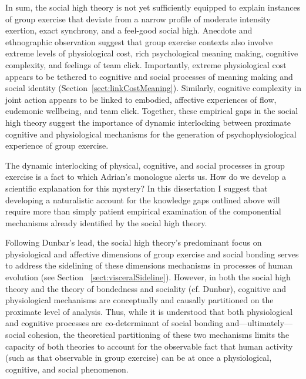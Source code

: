 \begin{CJK}{UTF8}{gbsn}
In sum, the social high theory is not yet sufficiently equipped to explain instances of group exercise that deviate from a narrow profile of moderate intensity exertion, exact synchrony, and a feel-good social high.  Anecdote and ethnographic observation suggest that group exercise contexts also involve extreme levels of physiological cost, rich psychological meaning making, cognitive complexity, and feelings of team click.  Importantly, extreme physiological cost appears to be tethered to cognitive and social processes of meaning making and social identity (Section~\ref{sect:linkCostMeaning}).  Similarly, cognitive complexity in joint action appears to be linked to embodied, affective experiences of flow, eudemonic wellbeing, and team click.  Together, these empirical gaps in the social high theory suggest the importance of dynamic interlocking between proximate cognitive and physiological mechanisms for the generation of psychophysiological experience of group exercise.


The dynamic interlocking of physical, cognitive, and social processes in group exercise is a fact to which Adrian's monologue alerts us. How do we develop a scientific explanation for this mystery? In this dissertation I suggest that developing a naturalistic account for the knowledge gaps outlined above will require more than simply patient empirical examination of the componential mechanisms already identified by the social high theory.

Following Dunbar's lead, the social high theory's predominant focus on physiological and affective dimensions of group exercise and social bonding serves to address the sidelining of these dimensions mechanisms in processes of human evolution (see Section ~\ref{sect:visceralSideline}).  However, in both the social high theory and the theory of bondedness and sociality (cf. Dunbar), cognitive and physiological mechanisms are conceptually and causally partitioned on the proximate level of analysis. Thus, while it is understood that both physiological and cognitive processes are co-determinant of social bonding and---ultimately---social cohesion, the theoretical partitioning of these two mechanisms limits the capacity of both theories to account for the observable fact that human activity (such as that observable in group exercise) can be at once a physiological, cognitive, and social phenomenon.


\end{CJK}
